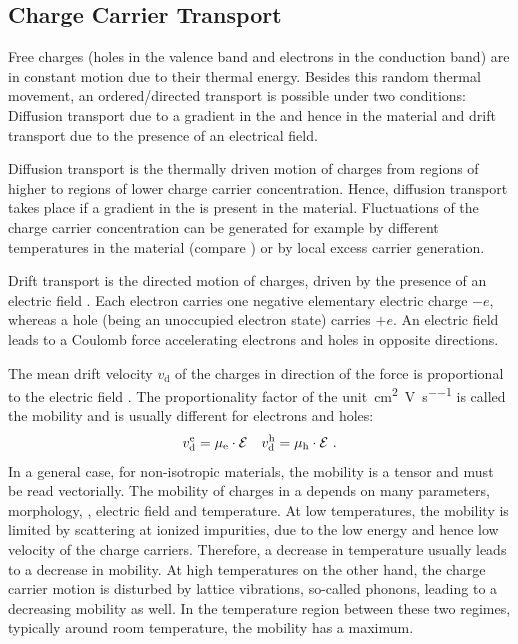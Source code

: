 \subsection{Charge Carrier Transport}\label{sec:TheoDiffusionCurrent}\label{sec:TheoDriftCurrent}
Free charges (holes in the valence band and electrons in the conduction band) are in constant motion due to their thermal energy. Besides this random thermal movement, an ordered/directed transport is possible under two conditions: Diffusion transport due to a gradient in the \nLong and hence \Ef in the material and drift transport due to the presence of an electrical field. %

Diffusion transport is the thermally driven motion of charges from regions of higher to regions of lower charge carrier concentration. Hence, diffusion transport takes place if a gradient in the \nLong is present in the material.
Fluctuations of the charge carrier concentration can be generated for example by different temperatures in the material (compare ) or by local excess carrier generation.

Drift transport is the directed motion of charges, driven by the presence of an electric field \EField. Each electron carries one negative elementary electric charge $-e$, whereas a hole (being an unoccupied electron state) carries $+e$.
An electric field leads to a Coulomb%
force accelerating electrons and holes in opposite directions.

The mean drift velocity $v_\text{d}$ of the charges in direction of the force is proportional to the electric field \EField. The proportionality factor of the unit~\si[per=frac]{\centi\meter\squared\per\volt\per\second} is called the mobility \mob and is usually different for electrons and holes:
\begin{align}
 v_\text{d}^\text{e} = \mobe \cdot \EField & & v_\text{d}^\text{h} = \mobh \cdot \EField \label{eq:vdrift}
\PUNKT
\end{align}
In a general case, \eg for non-isotropic materials, the mobility is a tensor and \lasteqn must be read vectorially. The mobility of charges in a \SC depends on many parameters, \eg morphology, \nLong, electric field and temperature. At low temperatures, the mobility is limited by scattering at ionized impurities, due to the low energy and hence low velocity of the charge carriers. Therefore, a decrease in temperature usually leads to a decrease in mobility. At high temperatures on the other hand, the charge carrier motion is disturbed by lattice vibrations, so-called phonons, leading to a decreasing mobility as well. In the temperature region between these two regimes, typically around room temperature, the mobility has a maximum.

